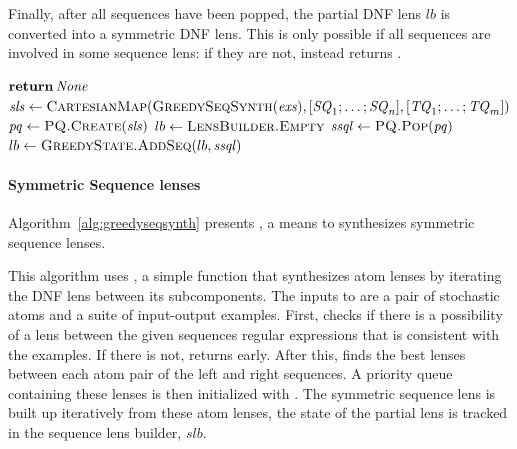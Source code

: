\documentclass[acmsmall,screen,anonymous]{acmart}
\begin{document}
Finally, after all sequences have been popped, the partial DNF lens $lb$ is
converted into a symmetric DNF lens. This is only possible if all sequences are
involved in some sequence lens: if they are not, 
instead returns \None.

\begin{algorithm}
  \caption{\GreedySynth}
  \label{alg:greedysynth}
  \begin{algorithmic}[1]
    \State $\ReturnVal{\None}$
    \EndIf
    \State $\SLS \gets
    \Call{\CartesianMap}{\GreedySeqSynth(\Examples),\ListOf{\Sequence_1;\ldots;\Sequence_n},\ListOf{\SequenceAlt_1;\ldots;\SequenceAlt_m}}$
    \State $\GreedyState \gets \Call{PQ.Create}{\SLS}$
    \State $lb \gets \Call{LensBuilder.Empty}{}$
    \State $\SSQLens \gets
    \Call{PQ.Pop}{\GreedyState}$
    \State $lb \gets \Call{GreedyState.AddSeq}{lb,\SSQLens}$
    \EndIf
    \EndWhile
    \State {}
    \EndFunction
  \end{algorithmic}
\end{algorithm}

\paragraph*{Symmetric Sequence lenses} Algorithm~\ref{alg:greedyseqsynth}
presents \GreedySeqSynth, a means to synthesizes symmetric sequence lenses.

This algorithm uses , a simple function that synthesizes atom
lenses by iterating the DNF lens between its subcomponents. The inputs to
\GreedySeqSynth are a pair of stochastic atoms and a suite of input-output
examples. First,  checks if there is a possibility of a lens
between the given sequences regular expressions that is consistent with the
examples. If there is not, \GreedySeqSynth returns \None early. After this,
\GreedySeqSynth finds the best lenses between each atom pair of the left and
right sequences. A priority queue containing these lenses is then initialized
with . The symmetric sequence lens is built up iteratively from
these atom lenses, the state of the partial lens is tracked in the sequence lens
builder, $slb$.
\end{document}
